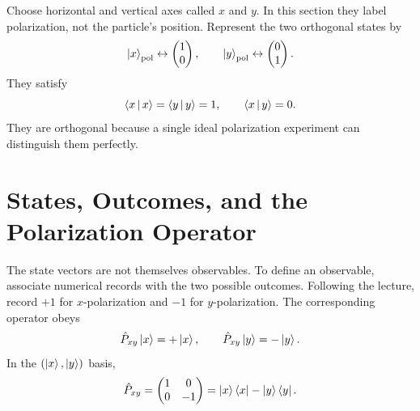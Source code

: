 \begin{classroomqa}
\end{classroomqa}

Choose horizontal and vertical axes called \(x\) and \(y\). In this section
they label polarization, not the particle's position. Represent the two
orthogonal states by
\begin{equation}
  \left\lvert x\right\rangle_{\mathrm{pol}}\leftrightarrow
  \begin{pmatrix}1\\0\end{pmatrix},
  \qquad
  \left\lvert y\right\rangle_{\mathrm{pol}}\leftrightarrow
  \begin{pmatrix}0\\1\end{pmatrix}.
  \label{eq:xy-polarization-basis}
\end{equation}
They satisfy
\begin{equation}
  \left\langle x\,\middle|\,x\right\rangle=\left\langle y\,\middle|\,y\right\rangle=1,
  \qquad
  \left\langle x\,\middle|\,y\right\rangle=0.
  \label{eq:xy-orthogonality}
\end{equation}
They are orthogonal because a single ideal polarization experiment can
distinguish them perfectly.

\section{States, Outcomes, and the Polarization Operator}

The state vectors are not themselves observables. To define an observable,
associate numerical records with the two possible outcomes. Following the
lecture, record \(+1\) for \(x\)-polarization and \(-1\) for
\(y\)-polarization. The corresponding operator obeys
\begin{equation}
  \hat P_{xy}\left\lvert x\right\rangle=+\left\lvert x\right\rangle,
  \qquad
  \hat P_{xy}\left\lvert y\right\rangle=-\left\lvert y\right\rangle.
  \label{eq:Pxy-eigenvalue}
\end{equation}
In the \((\left\lvert x\right\rangle,\left\lvert y\right\rangle)\) basis,
\begin{equation}
  \hat P_{xy}
  =
  \begin{pmatrix}
    1&0\\
    0&-1
  \end{pmatrix}
  =\left\lvert x\right\rangle\left\langle x\right\rvert-\left\lvert y\right\rangle\left\langle y\right\rvert.
  \label{eq:Pxy-matrix}
\end{equation}


